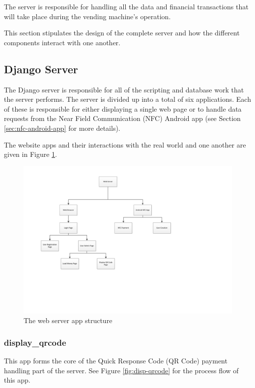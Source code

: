 The server is responsible for handling all the data and financial transactions that will take
place during the vending machine's operation. 

This section stipulates the design of the complete server and how the different components
interact with one another. 

\subsection{Django Server}

The Django server is responsible for all of the scripting and database work that the server
performs. The server is divided up into a total of six applications. Each of these is
responsible for either displaying a single web page or to handle data requests from the
Near Field Communication (NFC) Android app (see Section \ref{sec:nfc-android-app} for more
details).

The website apps and their interactions with the real world and one another
are given in Figure \ref{fig:website-apps}. 

\begin{figure}[h]
 \centering 
 \includegraphics[clip=true, trim = 0 130 130 30,
 scale=0.7]{website_structure}
 \caption{The web server app structure}
 \label{fig:website-apps}
\end{figure}

\subsubsection{display\_qrcode}

This app forms the core of the Quick Response Code (QR Code) payment handling part of the
server. See Figure \ref{fig:disp-qrcode} for the process flow of this app.

